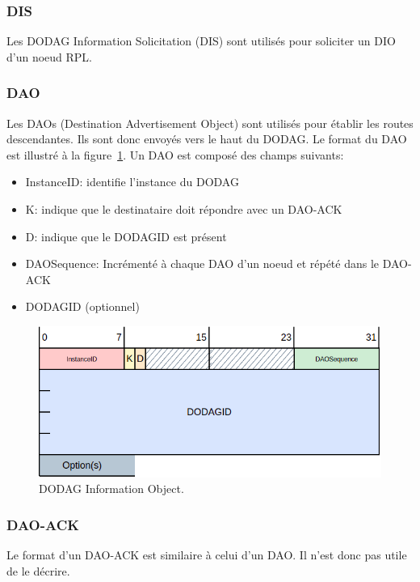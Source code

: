 \subsubsection*{DIS}
    Les DODAG Information Solicitation (DIS) sont utilisés pour soliciter un DIO d'un noeud RPL.

\subsubsection*{DAO}%
    Les DAOs (Destination Advertisement Object) sont utilisés pour établir les routes descendantes.
    Ils sont donc envoyés vers le haut du DODAG. Le format du DAO est illustré à la figure~\ref{fig:state-dao}. Un DAO est composé des champs suivants:
    \begin{itemize}
        \item InstanceID: identifie l'instance du DODAG
        \item K: indique que le destinataire doit répondre avec un DAO-ACK
        \item D: indique que le DODAGID est présent
        \item DAOSequence: Incrémenté à chaque DAO d'un noeud et répété dans le DAO-ACK
        \item DODAGID (optionnel)
    \end{itemize}
    \begin{figure}[H]
        \centering
        \includegraphics[scale=0.5]{res/pictures/dao.drawio.png}
        \caption{DODAG Information Object.}
        \label{fig:state-dao}
    \end{figure}

\subsubsection*{DAO-ACK}
    Le format d'un DAO-ACK est similaire à celui d'un DAO. Il n'est donc pas utile de le décrire.

